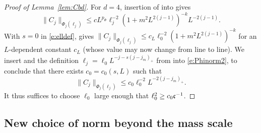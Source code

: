 \begin{proof}[Proof of Lemma~\ref{lem:Cbd}]
For $d=4$, insertion of  into  gives
\begin{equation}
    \label{e:Phinorm2}
    \|C_j\|_{\Phi_{j}(\ell_j)}
    \le
    c
    L^{p_\Phi}
    \ell_j^{-2}(1+m^2L^{2(j-1)})^{-k}
    L^{-2(j-1)}.
\end{equation}
With $s=0$ in \eqref{e:elldef},  gives
$\|C_j\|_{\Phi_{j}(\ell_j)} \le c_L \ell_0^{-2} (1+m^2L^{2(j-1)})^{-k}$
for an $L$-dependent constant $c_L$ (whose value may now change from line to line).
We insert  and the definition $\ell_j=\ell_0 L^{-j-s(j-j_m)_+}$ from
 into
\eqref{e:Phinorm2}, to conclude that there exists $c_0 = c_0(s, L)$ such that
\begin{equation}
    \|C_j\|_{\Phi_{j}(\ell_j)} \leq c_0 \ell_0^{-2} L^{-2(j - j_m)_+}
    .
\end{equation}
It thus suffices to choose $\ell_0$ large enough that
$\ell_0^2 \ge c_0 \mathfrak{c}^{-1}$.
\end{proof}


\subsection{New choice of norm beyond the mass scale}
\label{sec:newnorm}

